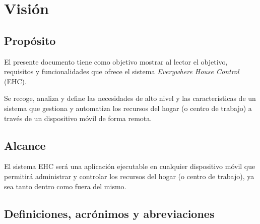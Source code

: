 \chapter{Visión}

\section{Propósito}
    El presente documento tiene como objetivo mostrar al lector el objetivo, requisitos y funcionalidades que ofrece el sistema \textit{Everywhere House Control} (EHC). \par
    Se recoge, analiza y define las necesidades de alto nivel y las características de un sistema que gestiona y automatiza los recursos del hogar (o centro de trabajo) a través de un dispositivo móvil de forma remota.

\section{Alcance}
    El sistema EHC será una aplicación ejecutable en cualquier dispositivo móvil que permitirá administrar y controlar los recursos del hogar (o centro de trabajo), ya sea tanto dentro como fuera del mismo.

\section{Definiciones, acrónimos y abreviaciones}
